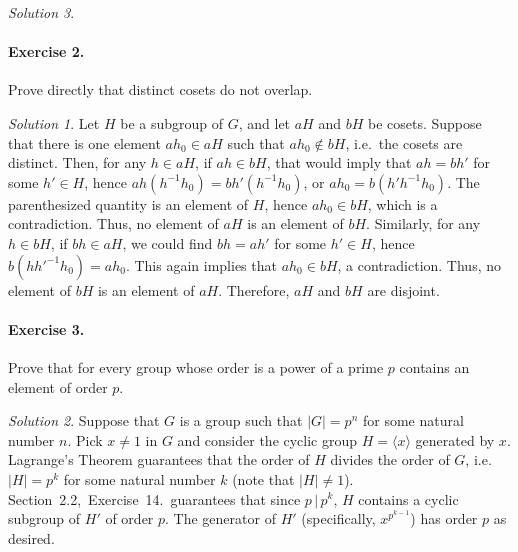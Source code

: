 \documentclass[11pt]{report}
\theoremstyle{remark}
\newtheorem*{solution}{Solution}
\begin{document}
\begin{solution}
    \paragraph{Exercise 2.} Prove directly that distinct cosets do not overlap.
    \begin{solution}
        Let $H$ be a subgroup of $G$, and let $aH$ and $bH$ be cosets. Suppose that
        there is one element $ah_0 \in aH$ such that $ah_0 \notin bH$, i.e.\ the
        cosets are distinct. Then, for any $h \in aH$, if $ah \in bH$, that would
        imply that $ah = bh'$ for some $h' \in H$, hence $ah(h^{-1}h_0) =
        bh'(h^{-1}h_0)$, or $ah_0 = b(h'h^{-1}h_0)$. The parenthesized quantity is
        an element of $H$, hence $ah_0 \in bH$, which is a contradiction. Thus, no
        element of $aH$ is an element of $bH$. Similarly, for any $h \in bH$, if
        $bh \in aH$, we could find $bh = ah'$ for some $h' \in H$, hence
        $b(hh'^{-1}h_0) = ah_0$. This again implies that $ah_0 \in bH$, a
        contradiction. Thus, no element of $bH$ is an element of $aH$. Therefore,
        $aH$ and $bH$ are disjoint.
    \end{solution}

    \paragraph{Exercise 3.} Prove that for every group whose order is a power of a
    prime $p$ contains an element of order $p$.
    \begin{solution}
        Suppose that $G$ is a group such that $|G| = p^n$ for some natural number
        $n$. Pick $x \neq 1$ in $G$ and consider the cyclic group $H = \langle x\rangle$
        generated by $x$. Lagrange's Theorem guarantees that the order of $H$
        divides the order of $G$, i.e.\ $|H| = p^k$ for some natural number $k$
        (note that $|H| \neq 1$). Section~2.2,~Exercise~14.\ guarantees that since
        $p \,|\, p^k$, $H$ contains a cyclic subgroup of $H'$ of order $p$. The
        generator of $H'$ (specifically, $x^{p^{k - 1}}$) has order $p$ as desired.
    \end{solution}
    

\end{solution}
\end{document}
